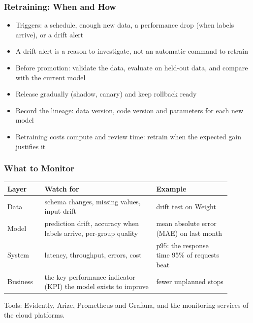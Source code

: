 \begin{frame}[fragile]\frametitle{Retraining: When and How}
\begin{itemize}
\item Triggers: a schedule, enough new data, a performance drop (when labels arrive), or a drift alert
\item A drift alert is a reason to investigate, not an automatic command to retrain
\item Before promotion: validate the data, evaluate on held-out data, and compare with the current model
\item Release gradually (shadow, canary) and keep rollback ready
\item Record the lineage: data version, code version and parameters for each new model
\item Retraining costs compute and review time: retrain when the expected gain justifies it
\end{itemize}
\end{frame}

\begin{frame}[fragile]\frametitle{What to Monitor}
\begin{center}
\small\renewcommand{\arraystretch}{1.35}
\begin{tabular}{>{\raggedright\arraybackslash}p{0.15\linewidth}>{\raggedright\arraybackslash}p{0.45\linewidth}>{\raggedright\arraybackslash}p{0.3\linewidth}}
\hline
\textbf{Layer} & \textbf{Watch for} & \textbf{Example} \\
\hline
Data & schema changes, missing values, input drift & drift test on Weight \\
Model & prediction drift, accuracy when labels arrive, per-group quality & mean absolute error (MAE) on last month \\
System & latency, throughput, errors, cost & p95: the response time 95\% of requests beat \\
Business & the key performance indicator (KPI) the model exists to improve & fewer unplanned stops \\
\hline
\end{tabular}
\end{center}
Tools: Evidently, Arize, Prometheus and Grafana, and the monitoring services of the cloud platforms.
\end{frame}

